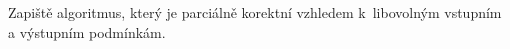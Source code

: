 \documentclass{ib002-exam}
\begin{document}
\begin{zadani}
Zapiště algoritmus, který je parciálně korektní vzhledem k~libovolným vstupním
a výstupním podmínkám.
\end{zadani}

\begin{reseni}
\end{reseni}
\end{document}

